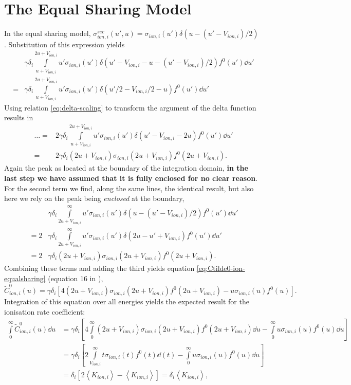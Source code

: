 \documentclass{book}
\newcommand{\MEAN}[1]{\ensuremath{\!\left\langle{{#1}}\right\rangle}}
\begin{document}
\section{The Equal Sharing Model}
In the equal sharing model, $\sigma_{ion,i}^{sec}(u',u)=\sigma_{ion,i}(u')\delta(u-(u'-V_{ion,i})/2)$
\cite[above eq. 16]{Manual_2_2_0}.
Substitution of this expression yields
\begin{align*}
	&\gamma\delta_i
		\int\limits_{u+V_{ion,i}}^{2u+V_{ion,i}}u'\sigma_{ion,i}(u')\delta(u'-V_{ion,i}-u-(u'-V_{ion,i})/2)f^0(u')\dd{u'}
	\\
	=&\gamma\delta_i
		\int\limits_{u+V_{ion,i}}^{2u+V_{ion,i}}u'\sigma_{ion,i}(u')\delta(u'/2-V_{ion,i}/2-u)f^0(u')\dd{u'}
\end{align*}
Using relation \eqref{eq:delta-scaling} to transform the argument of the delta function
results in
\begin{align*}
	\ldots =&2\gamma\delta_i
		\int\limits_{u+V_{ion,i}}^{2u+V_{ion,i}}u'\sigma_{ion,i}(u')\delta(u'-V_{ion,i}-2u)f^0(u')\dd{u'}
	\\
	=&2\gamma\delta_i(2u+V_{ion,i})\sigma_{ion,i}(2u+V_{ion,i})f^0(2u+V_{ion,i})
	.
\end{align*}
Again the peak as located at the boundary of the integration domain, {\bf in the last step
we have assumed that it is fully enclosed for no clear reason}. For the second term we find,
along the same lines, the identical result, but also here we rely on the peak being
{\em enclosed} at the boundary,
\begin{align*}
	&\gamma\delta_i
		\int\limits_{2u+V_{ion,i}}^{\infty}u'\sigma_{ion,i}(u')\delta(u-(u'-V_{ion,i})/2)f^0(u')\dd{u'}
	\\
	=2&\gamma\delta_i
		\int\limits_{2u+V_{ion,i}}^{\infty}u'\sigma_{ion,i}(u')\delta(2u-u'+V_{ion,i})f^0(u')\dd{u'}
	\\
	=2&\gamma\delta_i
		(2u+V_{ion,i})\sigma_{ion,i}(2u+V_{ion,i})f^0(2u+V_{ion,i}).
\end{align*}
Combining these terms and adding the third yields equation
\eqref{eq:Ctilde0-ion-equalsharing}
(equation 16 in \cite{Manual_2_2_0}),
\[
	\tilde{C}^0_{ion,i}(u)
	=\gamma\delta_i\left[
		4(2u+V_{ion,i})\sigma_{ion,i}(2u+V_{ion,i})f^0(2u+V_{ion,i})
		-
		u\sigma_{ion,i}(u)f^0(u)
	\right].
\]
Integration of this equation over all energies yields the expected result for the
ionisation rate coefficient:
\begin{align}
	\int\limits_0^\infty\tilde{C}^0_{ion,i}(u)\dd{u}
	&=\gamma\delta_i\left[
		4\int\limits_0^\infty(2u+V_{ion,i})\sigma_{ion,i}(2u+V_{ion,i})f^0(2u+V_{ion,i})\dd{u}
		-
		\int\limits_0^\infty u\sigma_{ion,i}(u)f^0(u)\dd{u}
	\right]
	\nonumber\\
	&=\gamma\delta_i\left[
		2\int\limits_{V_{ion,i}}^\infty t\sigma_{ion,i}(t)f^0(t)\dd{(t)}
		-
		\int\limits_0^\infty u\sigma_{ion,i}(u)f^0(u)\dd{u}
	\right]
	\nonumber\\
	&=\delta_i\left[2\MEAN{K_{ion,i}} - \MEAN{K_{ion,i}}\right] = \delta_i\MEAN{K_{ion,i}},
\end{align}
\end{document}
